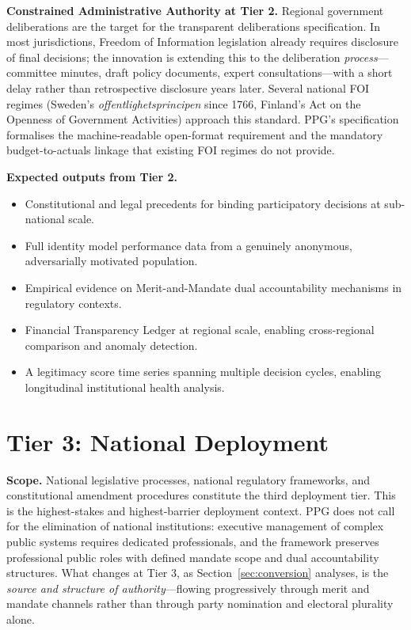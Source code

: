 \documentclass[12pt,a4paper,oneside]{report}
\begin{document}
\textbf{Constrained Administrative Authority at Tier 2.} Regional government deliberations are the target for the transparent deliberations specification. In most jurisdictions, Freedom of Information legislation already requires disclosure of final decisions; the innovation is extending this to the deliberation \emph{process}---committee minutes, draft policy documents, expert consultations---with a short delay rather than retrospective disclosure years later. Several national FOI regimes (Sweden's \textit{offentlighetsprincipen} since 1766, Finland's Act on the Openness of Government Activities) approach this standard. PPG's specification formalises the machine-readable open-format requirement and the mandatory budget-to-actuals linkage that existing FOI regimes do not provide.

\textbf{Expected outputs from Tier 2.}
\begin{itemize}
  \item Constitutional and legal precedents for binding participatory decisions at sub-national scale.
  \item Full identity model performance data from a genuinely anonymous, adversarially motivated population.
  \item Empirical evidence on Merit-and-Mandate dual accountability mechanisms in regulatory contexts.
  \item Financial Transparency Ledger at regional scale, enabling cross-regional comparison and anomaly detection.
  \item A legitimacy score time series spanning multiple decision cycles, enabling longitudinal institutional health analysis.
\end{itemize}

\section{Tier 3: National Deployment}
\label{sec:tier3}

\textbf{Scope.} National legislative processes, national regulatory frameworks, and constitutional amendment procedures constitute the third deployment tier. This is the highest-stakes and highest-barrier deployment context. PPG does not call for the elimination of national institutions: executive management of complex public systems requires dedicated professionals, and the framework preserves professional public roles with defined mandate scope and dual accountability structures. What changes at Tier 3, as Section~\ref{sec:conversion} analyses, is the \emph{source and structure of authority}---flowing progressively through merit and mandate channels rather than through party nomination and electoral plurality alone.
\end{document}
